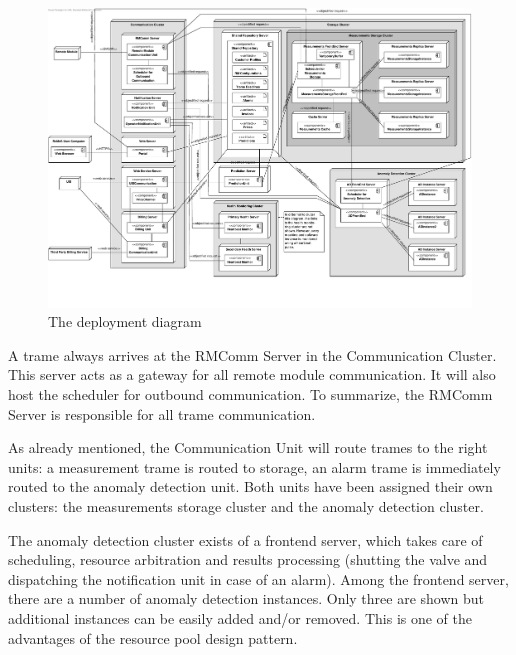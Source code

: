 \begin{figure}
	\begin{centering}
		\includegraphics[height=\textwidth,angle=90]{figs/final-deployment.pdf}
		\caption{The deployment diagram}
		\label{fig:final-deployment}
	\end{centering}
\end{figure}

\npar A trame always arrives at the RMComm Server in the Communication Cluster.
This server acts as a gateway for all remote module communication. It will also
host the scheduler for outbound communication. To summarize, the RMComm Server
is responsible for all trame communication. 

\npar As already mentioned, the Communication Unit will route trames to the
right units: a measurement trame is routed to storage, an alarm trame is
immediately routed to the anomaly detection unit. Both units have been assigned
their own clusters: the measurements storage cluster and the anomaly detection
cluster. 

\npar The anomaly detection cluster exists of a frontend server, which takes
care of scheduling, resource arbitration and results processing
(shutting the valve and dispatching the notification unit in case of an alarm).
Among the frontend server, there are a number of anomaly detection instances.
Only three are shown but additional instances can be easily added and/or
removed. This is one of the advantages of the resource pool design pattern.

